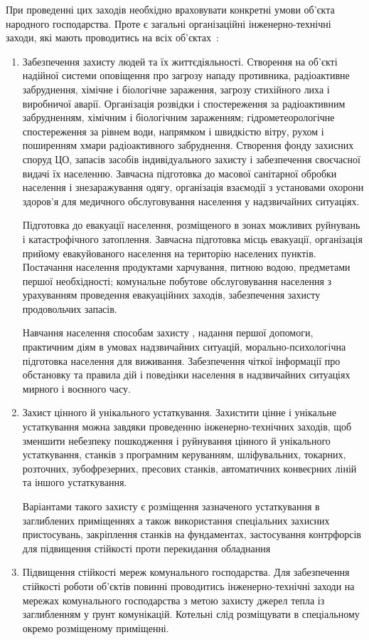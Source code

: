 При проведенні цих заходів необхідно враховувати конкретні умови об'єкта народного господарства. Проте є загальні організаційні інженерно-технічні заходи, які мають проводитись на всіх об'єктах~\cite{Civ4}:
\begin{enumerate}
	\item Забезпечення захисту людей та їх життєдіяльності. Створення на об'єкті надійної системи оповіщення про загрозу нападу противника, радіоактивне забруднення, хімічне і біологічне зараження, загрозу стихійного лиха і виробничої аварії. Організація розвідки і спостереження за радіоактивним забрудненням, хімічним і біологічним зараженням; гідрометеорологічне спостереження за рівнем води, напрямком і швидкістю вітру, рухом і поширенням хмари радіоактивного забруднення. Створення фонду захисних споруд ЦО, запасів засобів індивідуального захисту і забезпечення своєчасної видачі їх населенню. Завчасна підготовка до масової санітарної обробки населення і знезаражування одягу, організація взаємодії з установами охорони здоров'я для медичного обслуговування населення у надзвичайних ситуаціях.

	      Підготовка до евакуації населення, розміщеного в зонах можливих руйнувань і катастрофічного затоплення. Завчасна підготовка місць евакуації, організація прийому евакуйованого населення на територію населених пунктів. Постачання населення продуктами харчування, питною водою, предметами першої необхідності; комунальне побутове обслуговування населення з урахуванням проведення евакуаційних заходів, забезпечення захисту продовольчих запасів.

	      Навчання населення способам захисту , надання першої допомоги, практичним діям в умовах надзвичайних ситуацій, морально-психологічна підготовка населення для виживання. Забезпечення чіткої інформації про обстановку та правила дій і поведінки населення в надзвичайних ситуаціях мирного і воєнного часу.
	\item Захист цінного й унікального устаткування. Захистити цінне і унікальне устаткування можна завдяки проведенню інженерно-технічних заходів, щоб зменшити небезпеку пошкодження і руйнування цінного й унікального устаткування, станків з програмним керуванням, шліфувальних, токарних, розточних, зубофрезерних, пресових станків, автоматичних конвеєрних ліній та іншого устаткування.

	      Варіантами такого захисту є розміщення зазначеного устаткування в заглиблених приміщеннях а також використання спеціальних захисних пристосувань, закріплення станків на фундаментах, застосування контрфорсів для підвищення стійкості проти перекидання обладнання
	\item Підвищення стійкості мереж комунального господарства. Для забезпечення стійкості роботи об'єктів повинні проводитись інженерно-технічні заходи на мережах комунального господарства з метою захисту джерел тепла із заглибленням у ґрунт комунікацій. Котельні слід розміщувати в спеціальному окремо розміщеному приміщенні.


\end{enumerate}
